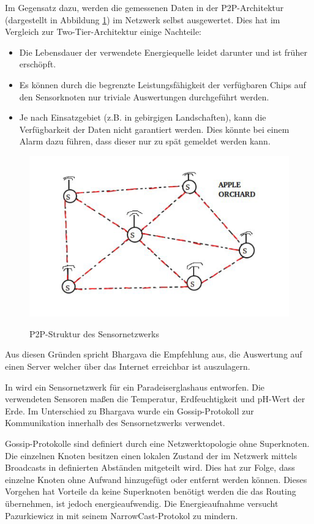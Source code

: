 Im Gegensatz dazu, werden die gemessenen Daten in der P2P-Architektur (dargestellt in Abbildung \ref{fig:p2p_architecture_img}) im Netzwerk selbst ausgewertet. Dies hat im Vergleich zur Two-Tier-Architektur einige Nachteile:
\begin{itemize}
	\item Die Lebensdauer der verwendete Energiequelle leidet darunter und ist früher erschöpft.
	\item Es können durch die begrenzte Leistungsfähigkeit der verfügbaren Chips auf den Sensorknoten nur triviale Auswertungen durchgeführt werden.
	\item Je nach Einsatzgebiet (z.B. in gebirgigen Landschaften), kann die Verfügbarkeit der Daten nicht garantiert werden. Dies könnte bei einem Alarm dazu führen, dass dieser nur zu spät gemeldet werden kann.
\end{itemize}

\begin{figure}[h]
 \includegraphics[scale=0.75,natwidth=\textwidth]{figures/sensors/p2p_architecture.png}
 \centering
 \label{fig:p2p_architecture_img}
 \caption{P2P-Struktur des Sensornetzwerks \cite{jour:Bhargava2014}}
\end{figure}

Aus diesen Gründen spricht Bhargava die Empfehlung aus, die Auswertung auf einen Server welcher über das Internet erreichbar ist auszulagern.

In \cite{jour:Srbinovska2014} wird ein Sensornetzwerk für ein Paradeiserglashaus entworfen. Die verwendeten Sensoren maßen die Temperatur, Erdfeuchtigkeit und pH-Wert der Erde. Im Unterschied zu Bhargava wurde ein Gossip-Protokoll zur Kommunikation innerhalb des Sensornetzwerks verwendet.

Gossip-Protokolle sind definiert durch eine Netzwerktopologie ohne Superknoten. Die einzelnen Knoten besitzen einen lokalen Zustand der im Netzwerk mittels Broadcasts in definierten Abständen mitgeteilt wird. Dies hat zur Folge, dass einzelne Knoten ohne Aufwand hinzugefügt oder entfernt werden können. Dieses Vorgehen hat Vorteile da keine Superknoten benötigt werden die das Routing übernehmen, ist jedoch energieaufwendig. Die Energieaufnahme versucht Pazurkiewicz in \cite{jour:Pazurkiewicz2014} mit seinem NarrowCast-Protokol zu mindern.

